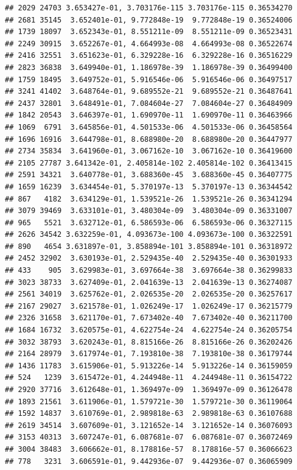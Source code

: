 \documentclass[
]{article}
\begin{document}
\begin{verbatim}
## 2029 24703 3.653427e-01, 3.703176e-115 3.703176e-115 0.36534270
## 2681 35145  3.652401e-01, 9.772848e-19  9.772848e-19 0.36524006
## 1739 18097  3.652343e-01, 8.551211e-09  8.551211e-09 0.36523431
## 2249 30915  3.652267e-01, 4.664993e-08  4.664993e-08 0.36522674
## 2416 32551  3.651623e-01, 6.329228e-16  6.329228e-16 0.36516229
## 2823 36838  3.649940e-01, 1.186978e-39  1.186978e-39 0.36499400
## 1759 18495  3.649752e-01, 5.916546e-06  5.916546e-06 0.36497517
## 3241 41402  3.648764e-01, 9.689552e-21  9.689552e-21 0.36487641
## 2437 32801  3.648491e-01, 7.084604e-27  7.084604e-27 0.36484909
## 1842 20543  3.646397e-01, 1.690970e-11  1.690970e-11 0.36463966
## 1069  6791  3.645856e-01, 4.501533e-06  4.501533e-06 0.36458564
## 1696 16916  3.644798e-01, 8.688980e-20  8.688980e-20 0.36447977
## 2734 35834  3.641960e-01, 3.067162e-10  3.067162e-10 0.36419600
## 2105 27787 3.641342e-01, 2.405814e-102 2.405814e-102 0.36413415
## 2591 34321  3.640778e-01, 3.688360e-45  3.688360e-45 0.36407775
## 1659 16239  3.634454e-01, 5.370197e-13  5.370197e-13 0.36344542
## 867   4182  3.634129e-01, 1.539521e-26  1.539521e-26 0.36341294
## 3079 39469  3.633101e-01, 3.480304e-09  3.480304e-09 0.36331007
## 965   5521  3.632712e-01, 6.586593e-06  6.586593e-06 0.36327115
## 2626 34542 3.632259e-01, 4.093673e-100 4.093673e-100 0.36322591
## 890   4654 3.631897e-01, 3.858894e-101 3.858894e-101 0.36318972
## 2452 32902  3.630193e-01, 2.529435e-40  2.529435e-40 0.36301933
## 433    905  3.629983e-01, 3.697664e-38  3.697664e-38 0.36299833
## 3023 38733  3.627409e-01, 2.041639e-13  2.041639e-13 0.36274087
## 2561 34019  3.625762e-01, 2.026535e-20  2.026535e-20 0.36257617
## 2167 29027  3.621578e-01, 1.026249e-17  1.026249e-17 0.36215779
## 2326 31658  3.621170e-01, 7.673402e-40  7.673402e-40 0.36211700
## 1684 16732  3.620575e-01, 4.622754e-24  4.622754e-24 0.36205754
## 3032 38793  3.620243e-01, 8.815166e-26  8.815166e-26 0.36202426
## 2164 28979  3.617974e-01, 7.193810e-38  7.193810e-38 0.36179744
## 1436 11783  3.615906e-01, 5.913226e-14  5.913226e-14 0.36159059
## 524   1239  3.615472e-01, 4.244948e-11  4.244948e-11 0.36154722
## 2920 37716  3.612648e-01, 1.369497e-09  1.369497e-09 0.36126478
## 1893 21561  3.611906e-01, 1.579721e-30  1.579721e-30 0.36119064
## 1592 14837  3.610769e-01, 2.989818e-63  2.989818e-63 0.36107688
## 2619 34514  3.607609e-01, 3.121652e-14  3.121652e-14 0.36076093
## 3153 40313  3.607247e-01, 6.087681e-07  6.087681e-07 0.36072469
## 3004 38483  3.606662e-01, 8.178816e-57  8.178816e-57 0.36066623
## 778   3231  3.606591e-01, 9.442936e-07  9.442936e-07 0.36065909

\end{verbatim}
\end{document}
